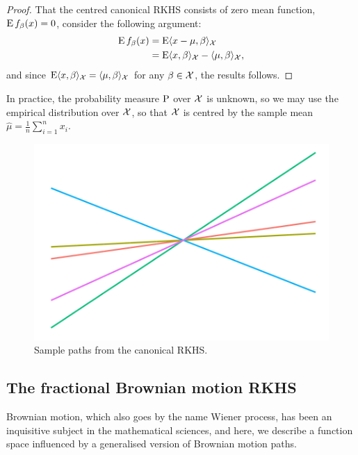\begin{proof}
  That the centred canonical RKHS consists of zero mean function, $\operatorname{E} f_\beta(x) = 0$, consider the following argument:
  \begin{align*}
    \operatorname{E} f_\beta(x) 
    &= \operatorname{E} \langle x-\mu,\beta\rangle_{\mathcal X} \\
    &= \operatorname{E} \langle x,\beta\rangle_{\mathcal X} - \langle\mu,\beta\rangle_{\mathcal X},
  \end{align*}
  and since $\operatorname{E} \langle x,\beta\rangle_{\mathcal X} = \langle\mu,\beta\rangle_{\mathcal X}$ for any $\beta\in{\mathcal X}$, the results follows.
\end{proof}

\begin{remark}
  In practice, the probability measure $\operatorname{P}$ over ${\mathcal X}$ is unknown, so we may use the empirical distribution over ${\mathcal X}$, so that ${\mathcal X}$ is centred by the sample mean $\hat\mu = \frac{1}{n}\sum_{i=1}^n x_i$.  
\end{remark}

\begin{figure}[hbt]
  \centering
  \includegraphics[scale=0.3]{figure/kernel_path_canonical_th}
  \caption{Sample paths from the canonical RKHS.}
\end{figure}

\subsection{The fractional Brownian motion RKHS}

Brownian motion, which also goes by the name Wiener process, has been an inquisitive subject in the mathematical sciences, and here, we describe a function space influenced by a generalised version of Brownian motion paths.

